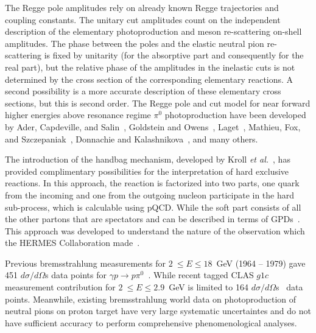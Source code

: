 \documentclass[aps,prc,onecolumn,floatfix,showpacs,preprintnumbers,amsmath,amssymb,superscriptaddress]{revtex4-1}
\begin{document}
The Regge pole amplitudes rely on already known Regge 
trajectories and coupling constants. The unitary cut amplitudes 
count on the independent description of the elementary 
photoproduction and meson re-scattering on-shell amplitudes.  
\color{red}{This approach is "parameter free". There is little degree of 
freedom left. One possibility is the relative sign between 
amplitudes.}\color{blue}{These 3 sentences has grammatical errors. The first sentence has no definitive subject, therefore ambiguous. The second sentence is not linked to any other sentence and therefore an incomplete sentence. The third sentence does not define the relation of "Possibility"} \color{black}The phase between the poles and the elastic neutral 
pion re-scattering is fixed by unitarity (for the absorptive 
part and consequently for the real part), but the relative 
phase of the amplitudes in the inelastic cuts is not 
determined by the cross section of the corresponding elementary 
reactions. A second possibility is a more accurate description 
of these elementary cross sections, but this is second order.  
The Regge pole and cut model for near forward higher energies 
above resonance regime $\pi^0$ photoproduction have been developed by 
Ader, Capdeville, and Salin~\cite{Ader}, Goldstein and 
Owens~\cite{Goldstein}, Laget~\cite{Laget}, Mathieu, Fox, and 
Szczepaniak~\cite{Mathieu}, Donnachie and 
Kalashnikova~\cite{Donnachie}, and many others.

The introduction of the handbag mechanism, developed by Kroll 
\textit{et al.}~\cite{Kroll}, has provided complimentary 
possibilities for the interpretation of hard exclusive 
reactions. In this approach, the reaction is factorized into 
two parts, one quark from the incoming and one from the 
outgoing nucleon participate in the hard sub-process, which is 
calculable using pQCD. While the soft part consists of all the 
other partons that are spectators and can be described in 
terms of GPDs~\cite{HM}. This approach was developed to 
understand the nature of the observation which the HERMES 
Collaboration made~\cite{Moskov}.

Previous bremsstrahlung measurements for $2~\leq E\leq 
18$~GeV (1964 -- 1979) gave 451 $d\sigma/d\Omega$s data points for 
$\gamma p\to p\pi^0$~\cite{brem}.  While recent tagged CLAS 
$g1c$ measurement contribution for $2~\leq E\leq 2.9$~GeV 
is limited to 164 $d\sigma/d\Omega$s~\cite{du07} data points.  Meanwhile, 
existing bremsstrahlung world data on photoproduction of neutral 
pions on proton target have very large systematic uncertaintes 
and do not have sufficient accuracy to perform comprehensive 
phenomenological analyses.
\end{document}
